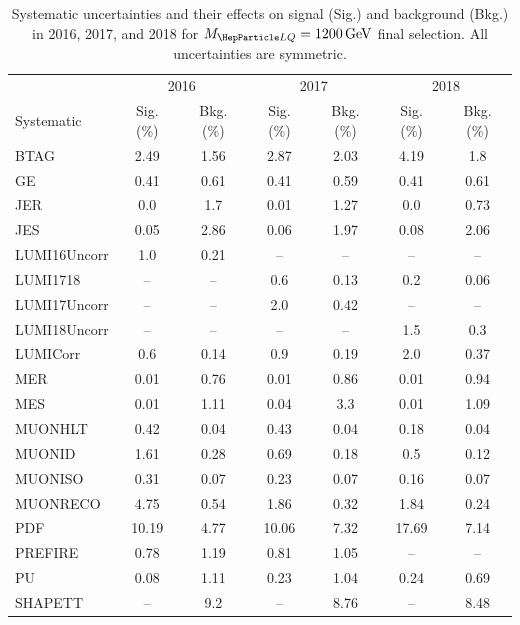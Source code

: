 \begin{table}[H]
	\begin{center}
        \begin{footnotesize}
			\caption{Systematic uncertainties and their effects on signal (Sig.) and background (Bkg.) in 2016, 2017, and 2018 for $\MLQ = \SI{1200}{GeV}$ final selection. All uncertainties are symmetric.}
			\begin{tabular}{lcccccc} \hline \hline
				& \multicolumn{2}{c}{2016} & \multicolumn{2}{c}{2017} & \multicolumn{2}{c}{2018} \\
				Systematic & Sig. (\%) & Bkg. (\%) & Sig. (\%) & Bkg. (\%) & Sig. (\%) & Bkg. (\%) \\ \hline
				BTAG &  2.49  &  1.56 &  2.87  &  2.03 &  4.19  &  1.8 \\
				GE &  0.41  &  0.61 &  0.41  &  0.59 &  0.41  &  0.61 \\
				JER &  0.0  &  1.7 &  0.01  &  1.27 &  0.0  &  0.73 \\
				JES &  0.05  &  2.86 &  0.06  &  1.97 &  0.08  &  2.06 \\
				LUMI16Uncorr &  1.0  &  0.21 & -- & -- & -- & -- \\
				LUMI1718 & -- & -- &  0.6  &  0.13 &  0.2  &  0.06 \\
				LUMI17Uncorr & -- & -- &  2.0  &  0.42 & -- & -- \\
				LUMI18Uncorr & -- & -- & -- & -- &  1.5  &  0.3 \\
				LUMICorr &  0.6  &  0.14 &  0.9  &  0.19 &  2.0  &  0.37 \\
				MER &  0.01  &  0.76 &  0.01  &  0.86 &  0.01  &  0.94 \\
				MES &  0.01  &  1.11 &  0.04  &  3.3 &  0.01  &  1.09 \\
				MUONHLT &  0.42  &  0.04 &  0.43  &  0.04 &  0.18  &  0.04 \\
				MUONID &  1.61  &  0.28 &  0.69  &  0.18 &  0.5  &  0.12 \\
				MUONISO &  0.31  &  0.07 &  0.23  &  0.07 &  0.16  &  0.07 \\
				MUONRECO &  4.75  &  0.54 &  1.86  &  0.32 &  1.84  &  0.24 \\
				PDF &  10.19  &  4.77 &  10.06  &  7.32 &  17.69  &  7.14 \\
				PREFIRE &  0.78  &  1.19 &  0.81  &  1.05 & -- & -- \\
				PU &  0.08  &  1.11 &  0.23  &  1.04 &  0.24  &  0.69 \\
				SHAPETT & -- &  9.2 & -- &  8.76 & -- &  8.48 \\

\end{tabular}
\end{footnotesize}
\end{center}
\end{table}

